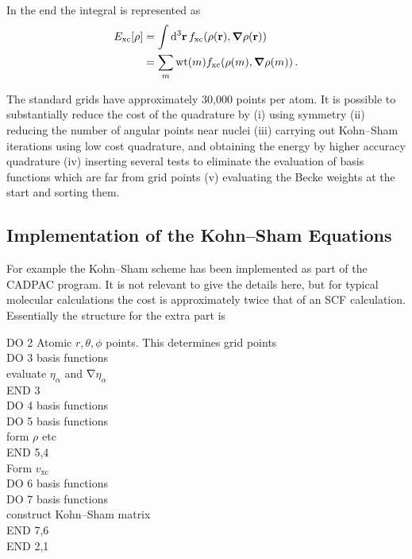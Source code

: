 \documentclass{article}
\theoremstyle{plain}\theoremheaderfont{\normalfont\itshape}\theorembodyfont{\rmfamily}\theoremseparator{.}\newtheorem*{rem}{Remark}\newtheorem*{ex}{Example}\newtheorem*{proof}{Proof}\newtheorem*{altp}{Alternative proof}
\theoremstyle{plain}\theoremheaderfont{\normalfont\bfseries}\theorembodyfont{\rmfamily}\theoremseparator{.}\newtheorem{thm}{Theorem}[section]\newtheorem{lem}[thm]{Lemma}\newtheorem{prop}[thm]{Proposition}\newtheorem*{cor}{Corollary}\newtheorem{defn}[thm]{Definition}\newtheorem{clm}[thm]{Claim}\newtheorem{clminproof}{Claim}
\theoremstyle{break}\theoremheaderfont{\normalfont\itshape}\theorembodyfont{\rmfamily}\theoremseparator{.\medskip}\newtheorem*{proofskip}{Proof}\newtheorem*{exs}{Examples}\newtheorem*{rems}{Remarks}
\theoremstyle{break}\theoremheaderfont{\normalfont\bfseries}\theorembodyfont{\rmfamily}\theoremseparator{.\medskip}\newtheorem{lemskip}[thm]{Lemma}\newtheorem{defnskip}[thm]{Definition}\newtheorem{propskip}[thm]{Proposition}\newtheorem{thmskip}[thm]{Theorem}
\numberwithin{equation}{section}
\newcommand{\dd}[2][]{\mathrm{d}^{#1} #2\,}
\newcommand{\vb}[1]{\bm{\mathrm{#1}}}
\newcommand{\grad}{\vb{\nabla}}
\newcommand{\xc}{_{\text{xc}}}
\begin{document}
    In the end the integral is represented as
    \begin{align}
        E\xc[\rho]&=\int\dd[3]{\vb{r}}f\xc(\rho(\vb{r}),\grad\rho(\vb{r}))\notag\\
        &=\sum_m \text{wt}(m)f\xc(\rho(m),\grad\rho(m))\,.
    \end{align}

    The standard grids have approximately 30,000 points per atom. It is possible to substantially reduce the cost of the quadrature by (i) using symmetry (ii) reducing the number of angular points near nuclei (iii) carrying out Kohn--Sham iterations using low cost quadrature, and obtaining the energy by higher accuracy quadrature (iv) inserting several tests to eliminate the evaluation of basis functions which are far from grid points (v) evaluating the Becke weights at the start and sorting them.
    \subsection{Implementation of the Kohn--Sham Equations}
    For example the Kohn--Sham scheme has been implemented as part of the CADPAC program. It is not relevant to give the details here, but for typical molecular calculations the cost is approximately twice that of an SCF calculation. Essentially the structure for the extra part is

    \begin{minipage}{0.7\textwidth}
        DO 2 Atomic \(r,\theta,\phi\) points. This determines grid points\\
        DO 3 basis functions\\
        evaluate \(\eta_\alpha\) and \(\grad\eta_\alpha\)\\
        END 3\\
        DO 4 basis functions\\
        DO 5 basis functions\\
        form \(\rho\) etc\\
        END 5,4\\
        Form \(v\xc\)\\
        DO 6 basis functions\\
        DO 7 basis functions\\
        construct Kohn--Sham matrix\\
        END 7,6\\
        END 2,1\\ 
    \end{minipage}
\end{document}
